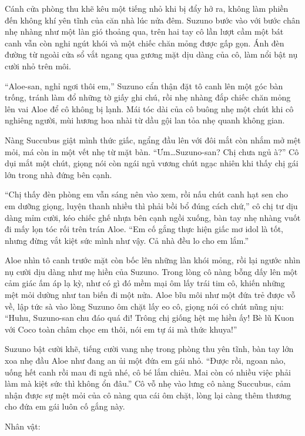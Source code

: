 \documentclass[../main.tex]{subfiles}
\begin{document}
Cánh cửa phòng thu khẽ kêu một tiếng nhỏ khi bị đẩy hở ra, không làm phiền đến không khí yên tĩnh của căn nhà lúc nửa đêm. Suzuno bước vào với bước chân nhẹ nhàng như một làn gió thoảng qua, trên hai tay cô lần lượt cầm một bát canh vẫn còn nghi ngút khói và một chiếc chăn mỏng được gấp gọn. Ánh đèn đường từ ngoài cửa sổ vắt ngang qua gương mặt dịu dàng của cô, làm nổi bật nụ cười nhỏ trên môi.

``Aloe-san, nghỉ ngơi thôi em,'' Suzuno cẩn thận đặt tô canh lên một góc bàn trống, tránh làm đổ những tờ giấy ghi chú, rồi nhẹ nhàng đắp chiếc chăn mỏng lên vai Aloe để cô không bị lạnh. Mái tóc dài của cô buông nhẹ một chút khi cô nghiêng người, mùi hương hoa nhài từ dầu gội lan tỏa nhẹ quanh không gian.

Nàng Succubus giật mình thức giấc, ngẩng đầu lên với đôi mắt còn nhắm mở mệt mỏi, má còn in một vết nhẹ từ mặt bàn. ``Ưm\dots Suzuno-san? Chị chưa ngủ à?'' Cô dụi mắt một chút, giọng nói còn ngái ngủ vương chút ngạc nhiên khi thấy chị gái lớn trong nhà đứng bên cạnh.

``Chị thấy đèn phòng em vẫn sáng nên vào xem, rồi nấu chút canh hạt sen cho em dưỡng giọng, luyện thanh nhiều thì phải bồi bổ đúng cách chứ,'' cô chị tư dịu dàng mỉm cười, kéo chiếc ghế nhựa bên cạnh ngồi xuống, bàn tay nhẹ nhàng vuốt đi mấy lọn tóc rối trên trán Aloe. ``Em cố gắng thực hiện giấc mơ idol là tốt, nhưng đừng vắt kiệt sức mình như vậy. Cả nhà đều lo cho em lắm.''

Aloe nhìn tô canh trước mặt còn bốc lên những làn khói mỏng, rồi lại ngước nhìn nụ cười dịu dàng như mẹ hiền của Suzuno. Trong lòng cô nàng bỗng dấy lên một cảm giác ấm áp lạ kỳ, như có gì đó mềm mại ôm lấy trái tim cô, khiến những mệt mỏi dường như tan biến đi một nửa. Aloe bĩu môi như một đứa trẻ được vỗ về, lập tức sà vào lòng Suzuno ôm chặt lấy eo cô, giọng nói có chút nũng nịu: ``Huhu, Suzuno-san chu đáo quá đi! Trông chị giống hệt mẹ hiền ấy! Bè lũ Kuon với Coco toàn châm chọc em thôi, nói em tự ái mà thức khuya!''

Suzuno bật cười khẽ, tiếng cười vang nhẹ trong phòng thu yên tĩnh, bàn tay lớn xoa nhẹ đầu Aloe như đang an ủi một đứa em gái nhỏ. ``Được rồi, ngoan nào, uống hết canh rồi mau đi ngủ nhé, cô bé lắm chiêu. Mai còn có nhiều việc phải làm mà kiệt sức thì không ổn đâu.'' Cô vỗ nhẹ vào lưng cô nàng Succubus, cảm nhận được sự mệt mỏi của cô nàng qua cái ôm chặt, lòng lại càng thêm thương cho đứa em gái luôn cố gắng này.

\begin{center}
{\caviar\fontsize{12pt}{12pt}\selectfont Nhân vật:  }
\end{center}
\end{document}
